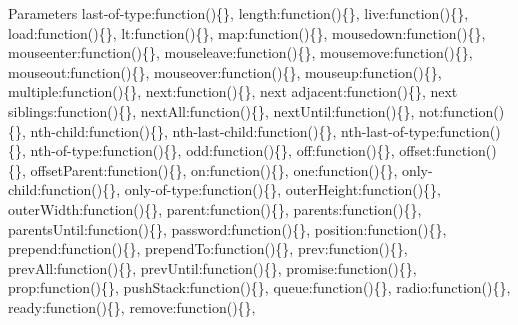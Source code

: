 \begin{DoxyParams}{Parameters}
\textquotesingle{}last-\/of-\/type\textquotesingle{}\+:function()\{\}, \textquotesingle{}length\textquotesingle{}\+:function()\{\}, \textquotesingle{}live\textquotesingle{}\+:function()\{\}, \textquotesingle{}load\textquotesingle{}\+:function()\{\}, \textquotesingle{}lt\textquotesingle{}\+:function()\{\}, \textquotesingle{}map\textquotesingle{}\+:function()\{\}, \textquotesingle{}mousedown\textquotesingle{}\+:function()\{\}, \textquotesingle{}mouseenter\textquotesingle{}\+:function()\{\}, \textquotesingle{}mouseleave\textquotesingle{}\+:function()\{\}, \textquotesingle{}mousemove\textquotesingle{}\+:function()\{\}, \textquotesingle{}mouseout\textquotesingle{}\+:function()\{\}, \textquotesingle{}mouseover\textquotesingle{}\+:function()\{\}, \textquotesingle{}mouseup\textquotesingle{}\+:function()\{\}, \textquotesingle{}multiple\textquotesingle{}\+:function()\{\}, \textquotesingle{}next\textquotesingle{}\+:function()\{\}, \textquotesingle{}next adjacent\textquotesingle{}\+:function()\{\}, \textquotesingle{}next siblings\textquotesingle{}\+:function()\{\}, \textquotesingle{}next\+All\textquotesingle{}\+:function()\{\}, \textquotesingle{}next\+Until\textquotesingle{}\+:function()\{\}, \textquotesingle{}not\textquotesingle{}\+:function()\{\}, \textquotesingle{}nth-\/child\textquotesingle{}\+:function()\{\}, \textquotesingle{}nth-\/last-\/child\textquotesingle{}\+:function()\{\}, \textquotesingle{}nth-\/last-\/of-\/type\textquotesingle{}\+:function()\{\}, \textquotesingle{}nth-\/of-\/type\textquotesingle{}\+:function()\{\}, \textquotesingle{}odd\textquotesingle{}\+:function()\{\}, \textquotesingle{}off\textquotesingle{}\+:function()\{\}, \textquotesingle{}offset\textquotesingle{}\+:function()\{\}, \textquotesingle{}offset\+Parent\textquotesingle{}\+:function()\{\}, \textquotesingle{}on\textquotesingle{}\+:function()\{\}, \textquotesingle{}one\textquotesingle{}\+:function()\{\}, \textquotesingle{}only-\/child\textquotesingle{}\+:function()\{\}, \textquotesingle{}only-\/of-\/type\textquotesingle{}\+:function()\{\}, \textquotesingle{}outer\+Height\textquotesingle{}\+:function()\{\}, \textquotesingle{}outer\+Width\textquotesingle{}\+:function()\{\}, \textquotesingle{}parent\textquotesingle{}\+:function()\{\}, \textquotesingle{}parents\textquotesingle{}\+:function()\{\}, \textquotesingle{}parents\+Until\textquotesingle{}\+:function()\{\}, \textquotesingle{}password\textquotesingle{}\+:function()\{\}, \textquotesingle{}position\textquotesingle{}\+:function()\{\}, \textquotesingle{}prepend\textquotesingle{}\+:function()\{\}, \textquotesingle{}prepend\+To\textquotesingle{}\+:function()\{\}, \textquotesingle{}prev\textquotesingle{}\+:function()\{\}, \textquotesingle{}prev\+All\textquotesingle{}\+:function()\{\}, \textquotesingle{}prev\+Until\textquotesingle{}\+:function()\{\}, \textquotesingle{}promise\textquotesingle{}\+:function()\{\}, \textquotesingle{}prop\textquotesingle{}\+:function()\{\}, \textquotesingle{}push\+Stack\textquotesingle{}\+:function()\{\}, \textquotesingle{}queue\textquotesingle{}\+:function()\{\}, \textquotesingle{}radio\textquotesingle{}\+:function()\{\}, \textquotesingle{}ready\textquotesingle{}\+:function()\{\}, \textquotesingle{}remove\textquotesingle{}\+:function()\{\}, 
\end{DoxyParams}
